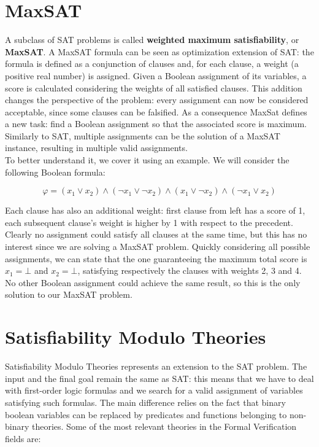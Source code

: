 \section{MaxSAT}
A subclass of SAT problems is called \textbf{weighted maximum satisfiability}, or \textbf{MaxSAT}. A MaxSAT formula can be seen as optimization extension of SAT: the formula is defined as a conjunction of clauses and, for each clause, a weight (a positive real number) is assigned. Given a Boolean assignment of its variables, a score is calculated considering the weights of all satisfied clauses. This addition changes the perspective of the problem: every assignment can now be considered acceptable, since some clauses can be falsified. As a consequence MaxSat defines a new task: find a Boolean assignment so that the associated score is maximum. Similarly to SAT, multiple assignments can be the solution of a MaxSAT instance, resulting in multiple valid assignments. \\
To better understand it, we cover it using an example. We will consider the following Boolean formula:

\begin{equation}
    \varphi = ( x_1 \vee x_2) \wedge (\neg x_1 \vee \neg x_2) \wedge ( x_1 \vee \neg x_2) \wedge (\neg x_1 \vee x_2)
\end{equation}

Each clause has also an additional weight: first clause from left has a score of 1, each subsequent clause's weight is higher by 1 with respect to the precedent. Clearly no assignment could satisfy all clauses at the same time, but this has no interest since we are solving a MaxSAT problem. Quickly considering all possible assignments, we can state that the one guaranteeing the maximum total score is $x_1 = \bot$ and $x_2 = \bot$, satisfying respectively the clauses with weights 2, 3 and 4. No other Boolean assignment could achieve the same result, so this is the only solution to our MaxSAT problem.

\section{Satisfiability Modulo Theories}

Satisfiability Modulo Theories represents an extension to the SAT problem. The input and the final goal remain the same as SAT: this means that we have to deal with first-order logic formulas and we search for a valid assignment of variables satisfying such formulas. The main difference relies on the fact that binary boolean variables can be replaced by predicates and functions belonging to non-binary theories. Some of the most relevant theories in the Formal Verification fields are:

